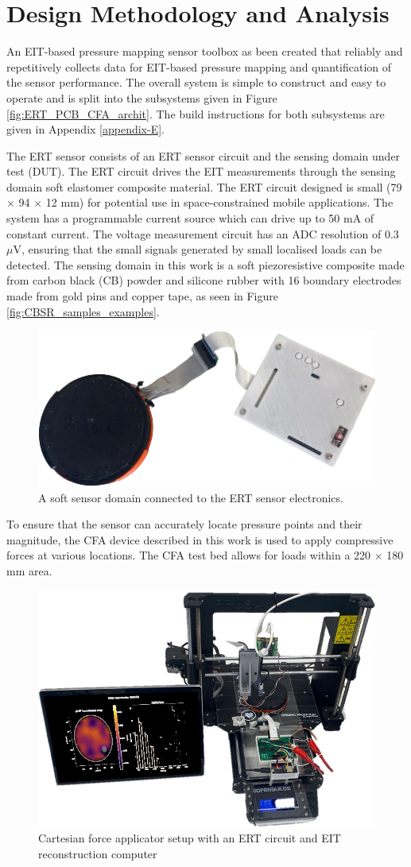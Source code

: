 \section{Design Methodology and Analysis} 
An EIT-based pressure mapping sensor toolbox as been created that reliably and repetitively collects data for EIT-based pressure mapping and quantification of the sensor performance. The overall system is simple to construct and easy to operate and is split into the subsystems given in Figure \ref{fig:ERT_PCB_CFA_archit}. The build instructions for both subsystems are given in Appendix \ref{appendix-E}.

The ERT sensor consists of an ERT sensor circuit and the sensing domain under test (DUT). The ERT circuit drives the EIT measurements through the sensing domain soft elastomer composite material. The ERT circuit designed is small (79 $\times$ 94 $\times$ 12 mm) for potential use in space-constrained mobile applications. 
The system has a programmable current source which can drive up to 50 mA of constant current. The voltage measurement circuit has an ADC resolution of 0.3 $\mu$V, ensuring that the small signals generated by small localised loads can be detected. The sensing domain in this work is a soft piezoresistive composite made from carbon black (CB) powder and silicone rubber with 16 boundary electrodes made from gold pins and copper tape, as seen in Figure \ref{fig:CBSR_samples_examples}.
\begin{figure}[H]
	\centering
	\includegraphics[width=0.6\linewidth]{Figures/ert_pcb_and_DUT.png}
	\caption{A soft sensor domain connected to the ERT sensor electronics.}
	\label{fig:ert_sensor}
\end{figure}
To ensure that the sensor can accurately locate pressure points and their magnitude, the CFA device described in this work is used to apply compressive forces at various locations. The CFA test bed allows for loads within a 220 $\times$ 180 mm area.
\begin{figure}[H]
	\centering
	\includegraphics[width=0.6\linewidth]{Figures/cfa_screen_pic.png}
	\caption{Cartesian force applicator setup with an ERT circuit and EIT reconstruction computer}
	\label{fig:cfa_setup}
\end{figure} 
